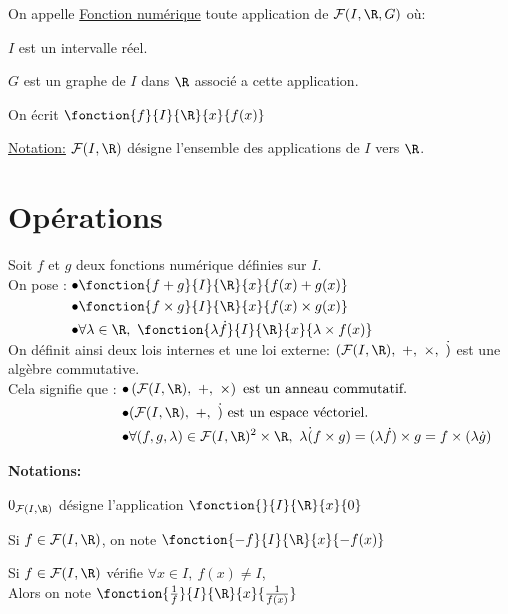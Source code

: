 \documentclass[12pt,twoside,a4paper]{article}
\author{MPSI 2}
\begin{document}
	\maketitle
	\begin{defi}
		On appelle \underline{Fonction num\'erique} toute application de $\mathcal{F}(I,\R,G)$ o\`u:
		\begin{liste}
			\item $I$ est un intervalle r\'eel.
			\item $G$ est un graphe de $I$ dans $\R$ associ\'e a cette application.
		\end{liste}
		On \'ecrit $\fonction{f}{I}{\R}{x}{f(x)}$
	\end{defi}
	\begin{flushleft}
		\underline{Notation:} $\mathcal{F}(I,\R)$ d\'esigne l'ensemble des applications de $I$ vers $\R$.
	\end{flushleft}
	\section{Op\'erations}
		\begin{flushleft}
			Soit $f$ et $g$ deux fonctions num\'erique d\'efinies sur $I$.\\
			On pose :
			$\begin{aligned}[t]
			\bullet & \fonction{f+g}{I}{\R}{x}{f(x)+g(x)}\\
			\bullet & \fonction{f\times g}{I}{\R}{x}{f(x)\times g(x)}\\
			\bullet & \forall \lambda \in \R,\ \fonction{\lambda\dot f}{I}{\R}{x}{\lambda\times f(x)}
			\end{aligned}$\\
			On d\'efinit ainsi deux lois internes et une loi externe: $(\mathcal{F}(I,\R),\ +,\ \times,\ \dot )$ est une alg\`ebre commutative.\\
			Cela signifie que :
			$\begin{aligned}[t]
			\bullet & \left(\mathcal{F}(I,\R),\ +,\ \times\right) \text{ est un anneau commutatif.}\\
			\bullet & (\mathcal{F}(I,\R),\ +,\ \dot) \text{ est un espace v\'ectoriel.}\\
			\bullet & \forall (f,g,\lambda)\in \mathcal{F}(I,\R)^{2}\times\R,\ \lambda\dot (f \times g) = (\lambda\dot f) \times g = f\times (\lambda\dot g)
			\end{aligned}$
		\end{flushleft}
		\begin{flushleft}
			\textbf{Notations:}
			\begin{liste}
				\item $0_{\mathcal{F}(I,\R)}$ d\'esigne l'application $\fonction{}{I}{\R}{x}{0}$
				\item Si $f\in \mathcal{F}(I,\R)$, on note $\fonction{-f}{I}{\R}{x}{-f(x)}$
				\item Si $f\in\mathcal{F}(I,\R)$ v\'erifie $\forall x\in I,\ f(x)\neq I$,\\
					Alors on note $\fonction{\frac{1}{f}}{I}{\R}{x}{\frac{1}{f(x)}}$
			\end{liste}
		\end{flushleft}
\end{document}
